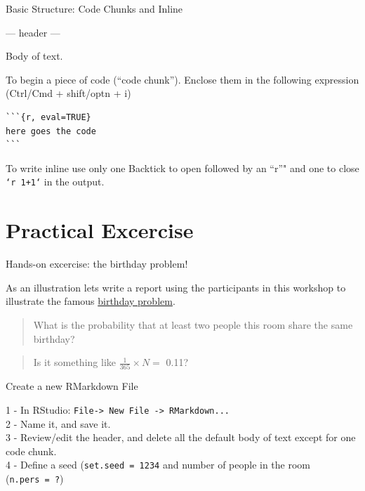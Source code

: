 \documentclass[ignorenonframetext,]{beamer}
\newenvironment{Shaded}{\begin{snugshade}}{\end{snugshade}}
\newcommand{\NormalTok}[1]{{#1}}
\begin{document}
\begin{frame}[fragile]{Basic Structure: Code Chunks and Inline}

\begin{Shaded}
\begin{Highlighting}[]
\NormalTok{---}
\NormalTok{header}
\NormalTok{---}
\end{Highlighting}
\end{Shaded}

Body of text.

To begin a piece of code (``code chunk''). Enclose them in the following
expression (Ctrl/Cmd + shift/optn + i)

\begin{verbatim}
```{r, eval=TRUE}
here goes the code
```
\end{verbatim}

To write inline use only one Backtick to open followed by an ``r''" and
one to close \texttt{`r\ 1+1`} in the output.

\end{frame}

\section{Practical Excercise}\label{practical-excercise}

\begin{frame}{Hands-on excercise: the birthday problem!}

As an illustration lets write a report using the participants in this
workshop to illustrate the famous
\href{https://en.wikipedia.org/wiki/Birthday_problem}{birthday problem}.

\begin{quote}
What is the probability that at least two people this room share the
same birthday?
\end{quote}

\begin{quote}
Is it something like \(\frac{1}{365} \times N =\) 0.11?
\end{quote}

\end{frame}

\begin{frame}[fragile]{Create a new RMarkdown File}

1 - In RStudio:
\texttt{File-\textgreater{}\ New\ File\ -\textgreater{}\ RMarkdown...}\\
2 - Name it, and save it.\\
3 - Review/edit the header, and delete all the default body of text
except for one code chunk.\\
4 - Define a seed (\texttt{set.seed\ =\ 1234} and number of people in
the room (\texttt{n.pers\ =\ ?})

\end{frame}
\end{document}
